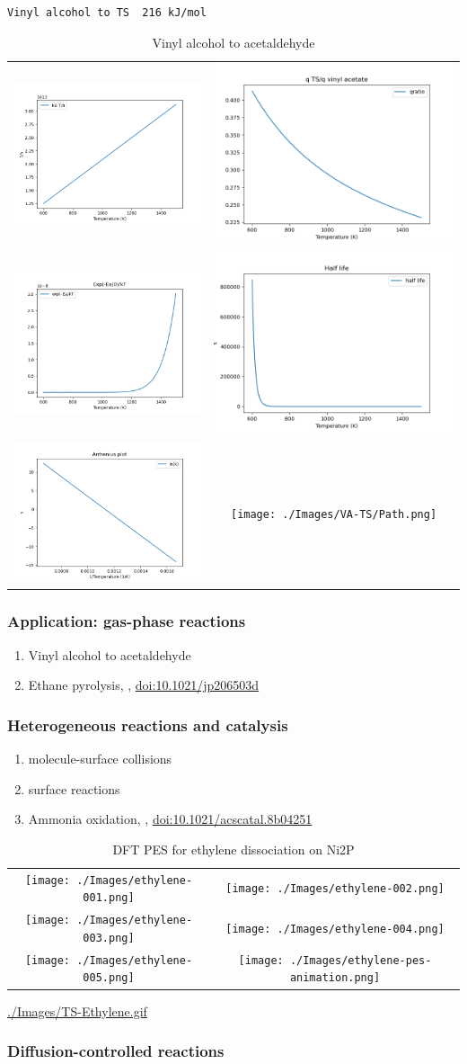 \documentclass[11pt]{article}
\begin{document}
\label{}
\begin{verbatim}
Vinyl alcohol to TS  216 kJ/mol
\end{verbatim}


\begin{table}
   \caption{Vinyl alcohol to acetaldehyde}
\begin{tabular}{cc}
\includegraphics[scale=0.5]{./Images/kTh.png} & \includegraphics[scale=0.5]{./Images/qratio.png} \\ \includegraphics[scale=0.5]{./Images/expEa.png} & \includegraphics[scale=0.5]{./Images/halflife.png} \\
\includegraphics[scale=0.5]{./Images/arrhenius.png} & 
\texttt{[image: ./Images/VA-TS/Path.png]} 
\end{tabular}
\end{table}
\subsubsection{Application: gas-phase reactions}
\label{sec:org345f594}
\begin{enumerate}
\item Vinyl alcohol to acetaldehyde
\item Ethane pyrolysis, , \href{https://pubs.acs.org/doi/10.1021/jp206503d}{doi:10.1021/jp206503d}
\end{enumerate}
\subsubsection{Heterogeneous reactions and catalysis}
\label{sec:orgc4f91d2}
\begin{enumerate}
\item molecule-surface collisions
\item surface reactions
\item Ammonia oxidation, , \href{http://pubs.acs.org/doi/10.1021/acscatal.8b04251}{doi:10.1021/acscatal.8b04251}
\end{enumerate}

\begin{table}
   \caption{DFT PES for ethylene dissociation on Ni2P}
\begin{tabular}{cc}
\texttt{[image: ./Images/ethylene-001.png]} & \texttt{[image: ./Images/ethylene-002.png]} \\ \texttt{[image: ./Images/ethylene-003.png]} & \texttt{[image: ./Images/ethylene-004.png]} \\
\texttt{[image: ./Images/ethylene-005.png]} & 
\texttt{[image: ./Images/ethylene-pes-animation.png]} 
\end{tabular}
\end{table}

\url{./Images/TS-Ethylene.gif}
\subsubsection{Diffusion-controlled reactions}
\label{sec:org89bec75}
\end{document}
